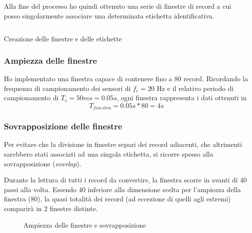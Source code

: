 Alla fine del processo ho quindi ottenuto una serie di finestre di record a cui posso singolarmente associare una determinata
etichetta identificativa.

\vfill
\begin{listing}[H] 
    \inputminted[frame=single,framesep=10pt]{python}{assets/snippets/classifier/create_segments_and_labels.py}
    \caption{Creazione delle finestre e delle etichette}
\end{listing}

\subsubsection{Ampiezza delle finestre}
Ho implementato una finestra capace di contenere fino a $80$ record. Ricordando la frequenza di 
campionamento dei sensori di $f_c = 20$ Hz e il relativo periodo di campionamento di $T_c = 50ms = 0.05s$, ogni finestra rappresenta i dati ottenuti in 
$$T_{finestra} = 0.05s * 80 = 4s$$

\subsubsection{Sovrapposizione delle finestre}
Per evitare che la divisione in finestre separi dei record adiacenti, che altrimenti sarebbero stati associati 
ad una singola etichetta, si ricorre spesso alla sovrapposizione (\textit{overlap}).

Durante la lettura di tutti i record da convertire, la finestra scorre in avanti 
di $40$ passi alla volta. Essendo $40$ inferiore alla dimensione scelta per l'ampiezza della finestra ($80$), 
la quasi totalità dei record (ad eccezione di quelli agli estremi) comparirà in 2 finestre distinte.

\vfill
\begin{figure}[H]
    \centering
    
    \caption{Ampiezza delle finestre e sovrapposizione}
    \label{fig:overlay}
\end{figure}


\newpage
